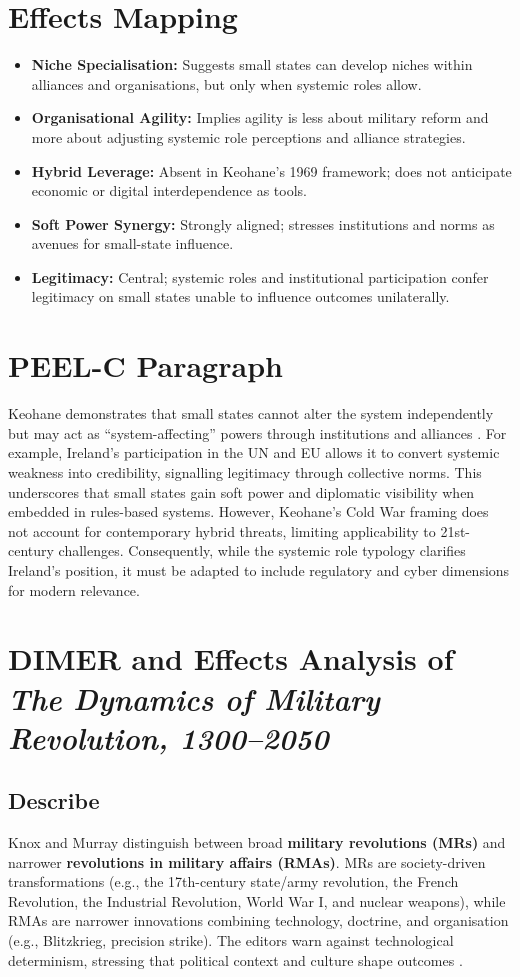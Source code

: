 \section*{Effects Mapping}
\begin{itemize}
	\item \textbf{Niche Specialisation:} Suggests small states can develop niches within alliances and organisations, but only when systemic roles allow.
	\item \textbf{Organisational Agility:} Implies agility is less about military reform and more about adjusting systemic role perceptions and alliance strategies.
	\item \textbf{Hybrid Leverage:} Absent in Keohane’s 1969 framework; does not anticipate economic or digital interdependence as tools.
	\item \textbf{Soft Power Synergy:} Strongly aligned; stresses institutions and norms as avenues for small-state influence.
	\item \textbf{Legitimacy:} Central; systemic roles and institutional participation confer legitimacy on small states unable to influence outcomes unilaterally.
\end{itemize}

\section*{PEEL-C Paragraph}
Keohane demonstrates that small states cannot alter the system independently but may act as “system-affecting” powers through institutions and alliances \parencite{KEOHANE_1969}. For example, Ireland’s participation in the UN and EU allows it to convert systemic weakness into credibility, signalling legitimacy through collective norms. This underscores that small states gain soft power and diplomatic visibility when embedded in rules-based systems. However, Keohane’s Cold War framing does not account for contemporary hybrid threats, limiting applicability to 21st-century challenges. Consequently, while the systemic role typology clarifies Ireland’s position, it must be adapted to include regulatory and cyber dimensions for modern relevance.

\section*{DIMER and Effects Analysis of \textit{The Dynamics of Military Revolution, 1300--2050}}

\subsection*{Describe}
Knox and Murray distinguish between broad \textbf{military revolutions (MRs)} and narrower \textbf{revolutions in military affairs (RMAs)}. MRs are society-driven transformations (e.g., the 17th-century state/army revolution, the French Revolution, the Industrial Revolution, World War I, and nuclear weapons), while RMAs are narrower innovations combining technology, doctrine, and organisation (e.g., Blitzkrieg, precision strike). The editors warn against technological determinism, stressing that political context and culture shape outcomes \parencite{MURRAY_2001}.

